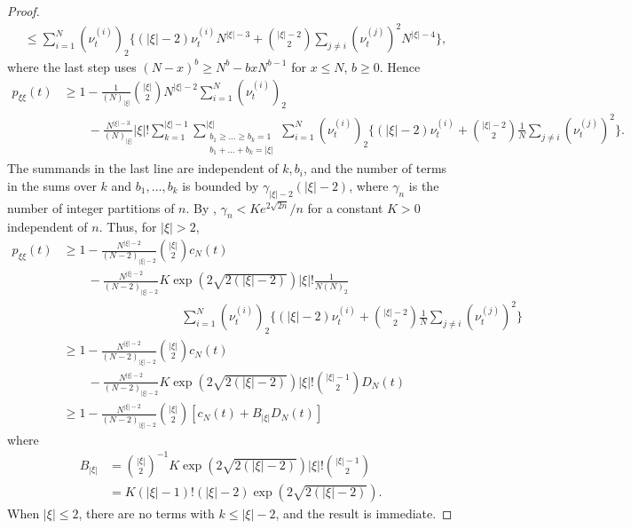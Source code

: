 \begin{proof}
\begin{align*}
&\leq \sum_{ i = 1 }^N ( \nu_t^{ ( i ) } )_2 \Bigg\{ ( | \xi | - 2 ) \nu_t^{ ( i ) } N^{ | \xi | - 3 } + \binom{ | \xi | - 2 }{ 2 } \sum_{ j \neq i } ( \nu_t^{ ( j ) } )^2 N^{ | \xi | - 4 } \Bigg\},
\end{align*}
where the last step uses $(N - x)^b \geq N^b - b x N^{ b - 1 }$ for $x \leq N$, $b \geq 0$.
Hence
\begin{align*}
p_{ \xi \xi }( t ) 
&\geq 1 - \frac{ 1 }{ ( N )_{ | \xi | } } \binom{|\xi|}{2}
        N^{ | \xi | - 2 } \sum_{ i = 1 }^N ( \nu_t^{ ( i ) } )_2 \\
    &\qquad- \frac{ N^{|\xi|-3} }{ ( N )_{ | \xi | } } |\xi|!
        \sum_{ k = 1 }^{ | \xi | - 1 } 
        \sum_{ \substack{ b_1 \geq \ldots \geq b_k = 1 
        \\ b_1 + \ldots + b_k = | \xi | } }^{ | \xi | } 
        \sum_{ i = 1 }^N ( \nu_t^{ ( i ) } )_2 
        \Bigg\{ ( | \xi | - 2 ) \nu_t^{ ( i ) } + \binom{ | \xi | - 2 }{ 2 } \frac{1}{N} 
        \sum_{ j \neq i } ( \nu_t^{ ( j ) } )^2 \Bigg\} .
\end{align*}
The summands in the last line are independent of $k, b_i$, and the number of terms in the sums over $k$ and $b_1, \dots, b_k$ is bounded by $\gamma_{|\xi|-2} (|\xi|-2)$, where $\gamma_n$ is the number of integer partitions of $n$.
By \textcite[Section 2]{hardy1918}, $\gamma_n < K e^{ 2 \sqrt{ 2 n } } / n$ for a constant $K > 0$ independent of $n$.
Thus, for $|\xi| > 2$,
\begin{align*}
p_{ \xi \xi }( t ) 
&\geq 1 - \frac{ N^{ | \xi | - 2 } }{ ( N-2 )_{ | \xi | -2} } \binom{|\xi|}{2}
        c_N(t) \\
    &\qquad- \frac{ N^{|\xi|-2} }{ ( N-2 )_{ | \xi | -2} }
        K \exp( 2 \sqrt{2(|\xi|-2)} ) |\xi|!
        \frac{1}{N(N)_2} \\
    &\hspace{4cm} \sum_{ i = 1 }^N ( \nu_t^{ ( i ) } )_2
        \Bigg\{ ( | \xi | - 2 ) \nu_t^{ ( i ) } + \binom{ | \xi | - 2 }{ 2 } \frac{1}{N} 
        \sum_{ j \neq i } ( \nu_t^{ ( j ) } )^2 \Bigg\} \\
&\geq 1 - \frac{ N^{ | \xi | - 2 } }{ ( N-2 )_{ | \xi | -2} } \binom{|\xi|}{2}
        c_N(t) \\
    &\qquad- \frac{ N^{|\xi|-2} }{ ( N-2 )_{ | \xi | -2} }
        K \exp( 2 \sqrt{2(|\xi|-2)} ) |\xi|! \binom{ |\xi|-1}{2} D_N(t) \\
&\geq 1 - \frac{ N^{ | \xi | - 2 } }{ ( N-2 )_{ | \xi | -2} } \binom{|\xi|}{2}
        \left[ c_N(t) + B_{|\xi|} D_N(t) \right]
\end{align*}
where
\begin{align*}
B_{|\xi|} 
&= \binom{|\xi|}{2}^{-1} K \exp( 2 \sqrt{2(|\xi|-2)} ) |\xi|! \binom{ |\xi|-1}{2} \\
&= K (|\xi|-1)! (|\xi|-2) \exp( 2 \sqrt{2(|\xi|-2)} ) .
\end{align*}
When $|\xi| \leq 2$, there are no terms with $k\leq |\xi|-2$, and the result is immediate.
\end{proof}


